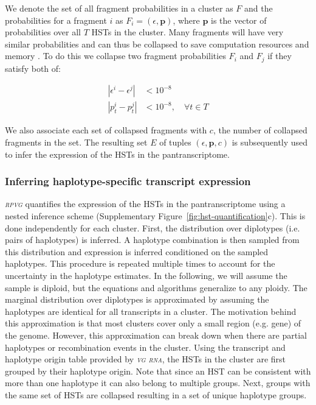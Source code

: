 \documentclass[11pt]{ucthesis}
\newcommand{\tool}[1]{\emph{\textsc{#1}}}
\begin{document}
We denote the set of all fragment probabilities in a cluster as $F$ and the probabilities for a fragment $i$ as ${F_i=\left(\epsilon,\textbf{p}\right)}$, where $\textbf{p}$ is the vector of probabilities over all $T$ HSTs in the cluster. Many fragments will have very similar probabilities and can thus be collapsed to save computation resources and memory \cite{nicolae2011estimation,patro2017salmon}. To do this we collapse two fragment probabilities $F_i$ and $F_j$ if they satisfy both of:

\begin{equation}
\begin{aligned}
    \left|\epsilon^{i}-\epsilon^{j}\right| &< 10^{-8} \\	\left|p_t^{i}-p_t^{j}\right| &< 10^{-8},\quad\forall t\in T
\end{aligned}
\end{equation}

We also associate each set of collapsed fragments with $c$, the number of collapsed fragments in the set. The resulting set $E$ of tuples ${\left(\epsilon, \textbf{p}, c\right)}$ is subsequently used to infer the expression of the HSTs in the pantranscriptome.

\subsubsection{Inferring haplotype-specific transcript expression}

\tool{rpvg} quantifies the expression of the HSTs in the pantranscriptome using a nested inference scheme (Supplementary Figure~\ref{fig:hst-quantification}c). This is done independently for each cluster. First, the distribution over diplotypes (i.e. pairs of haplotypes) is inferred. A haplotype combination is then sampled from this distribution and expression is inferred conditioned on the sampled haplotypes. This procedure is repeated multiple times to account for the uncertainty in the haplotype estimates. In the following, we will assume the sample is diploid, but the equations and algorithms generalize to any ploidy.
\newline 
\newline
The marginal distribution over diplotypes is approximated by assuming the haplotypes are identical for all transcripts in a cluster. The motivation behind this approximation is that most clusters cover only a small region (e.g. gene) of the genome. However, this approximation can break down when there are partial haplotypes or recombination events in the cluster. Using the transcript and haplotype origin table provided by \tool{vg rna}, the HSTs in the cluster are first grouped by their haplotype origin. Note that since an HST can be consistent with more than one haplotype it can also belong to multiple groups. Next, groups with the same set of HSTs are collapsed resulting in a set of unique haplotype groups. 
\end{document}
